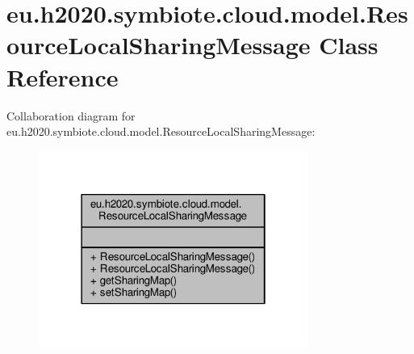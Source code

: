 \hypertarget{classeu_1_1h2020_1_1symbiote_1_1cloud_1_1model_1_1ResourceLocalSharingMessage}{}\section{eu.\+h2020.\+symbiote.\+cloud.\+model.\+Resource\+Local\+Sharing\+Message Class Reference}
\label{classeu_1_1h2020_1_1symbiote_1_1cloud_1_1model_1_1ResourceLocalSharingMessage}


Collaboration diagram for eu.\+h2020.\+symbiote.\+cloud.\+model.\+Resource\+Local\+Sharing\+Message\+:\nopagebreak
\begin{figure}[H]
\begin{center}
\leavevmode
\includegraphics[width=250pt]{classeu_1_1h2020_1_1symbiote_1_1cloud_1_1model_1_1ResourceLocalSharingMessage__coll__graph}
\end{center}
\end{figure}
